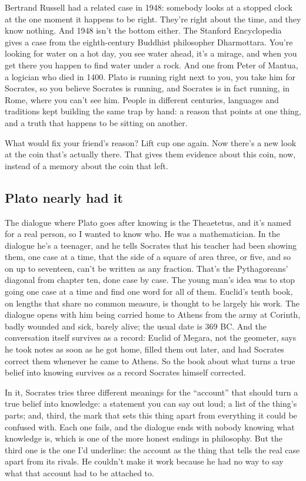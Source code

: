 \documentclass[11pt,twoside]{article}
\theoremstyle{thielethm}
\theoremstyle{thieledef}
\theoremstyle{thieledef}
\theoremstyle{thieledef}
\theoremstyle{thielethm}
\theoremstyle{thieleobs}
\theoremstyle{thielethm}
\begin{document}
Bertrand Russell had a related case in 1948: somebody looks at a stopped clock at the one moment it happens to be right. They're right about the time, and they know nothing. And 1948 isn't the bottom either. The Stanford Encyclopedia gives a case from the eighth-century Buddhist philosopher Dharmottara. You're looking for water on a hot day, you see water ahead, it's a mirage, and when you get there you happen to find water under a rock. And one from Peter of Mantua, a logician who died in 1400. Plato is running right next to you, you take him for Socrates, so you believe Socrates is running, and Socrates is in fact running, in Rome, where you can't see him. People in different centuries, languages and traditions kept building the same trap by hand: a reason that points at one thing, and a truth that happens to be sitting on another.

What would fix your friend's reason? Lift cup one again. Now there's a new look at the coin that's actually there. That gives them evidence about this coin, now, instead of a memory about the coin that left.

\subsection{Plato nearly had it}

The dialogue where Plato goes after knowing is the Theaetetus, and it's named for a real person, so I wanted to know who. He was a mathematician. In the dialogue he's a teenager, and he tells Socrates that his teacher had been showing them, one case at a time, that the side of a square of area three, or five, and so on up to seventeen, can't be written as any fraction. That's the Pythagoreans' diagonal from chapter ten, done case by case. The young man's idea was to stop going one case at a time and find one word for all of them. Euclid's tenth book, on lengths that share no common measure, is thought to be largely his work. The dialogue opens with him being carried home to Athens from the army at Corinth, badly wounded and sick, barely alive; the usual date is 369 BC. And the conversation itself survives as a record: Euclid of Megara, not the geometer, says he took notes as soon as he got home, filled them out later, and had Socrates correct them whenever he came to Athens. So the book about what turns a true belief into knowing survives as a record Socrates himself corrected.

In it, Socrates tries three different meanings for the ``account'' that should turn a true belief into knowledge: a statement you can say out loud; a list of the thing's parts; and, third, the mark that sets this thing apart from everything it could be confused with. Each one fails, and the dialogue ends with nobody knowing what knowledge is, which is one of the more honest endings in philosophy. But the third one is the one I'd underline: the account as the thing that tells the real case apart from its rivals. He couldn't make it work because he had no way to say what that account had to be attached to.
\end{document}
